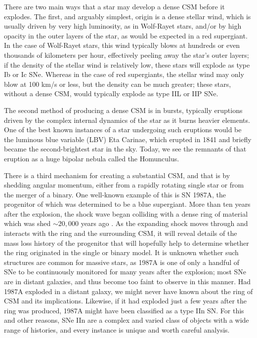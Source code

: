 \documentclass[a4paper,fleqn,usenatbib]{mnras}
\begin{document}
There are two main ways that a star may develop a dense CSM before it explodes. The first, and arguably simplest, origin is a dense stellar wind, which is usually driven by very high luminosity, as in Wolf-Rayet stars, and/or by high opacity in the outer layers of the star, as would be expected in a red supergiant. In the case of Wolf-Rayet stars, this wind typically blows at hundreds or even thousands of kilometers per hour, effectively peeling away the star's outer layers; if the density of the stellar wind is relatively low, these stars will explode as type Ib or Ic SNe. Whereas in the case of red supergiants, the stellar wind may only blow at 100 km/s or less, but the density can be much greater; these stars, without a dense CSM, would typically explode as type IIL or IIP SNe.

The second method of producing a dense CSM is in bursts, typically eruptions driven by the complex internal dynamics of the star as it burns heavier elements. One of the best known instances of a star undergoing such eruptions would be the luminous blue variable (LBV) Eta Carinae, which erupted in 1841 and briefly became the second-brightest star in the sky. Today, we see the remnants of that eruption as a huge bipolar nebula called the Homunculus.

There is a third mechanism for creating a substantial CSM, and that is by shedding angular momentum, either from a rapidly rotating single star or from the merger of a binary. One well-known example of this is SN 1987A, the progenitor of which was determined to be a blue supergiant. More than ten years after the explosion, the shock wave began colliding with a dense ring of material which was shed $\sim20,000$ years ago \citep{Fra15}. As the expanding shock moves through and interacts with the ring and the surrounding CSM, it will reveal details of the mass loss history of the progenitor that will hopefully help to determine whether the ring originated in the single or binary model. It is unknown whether such structures are common for massive stars, as 1987A is one of only a handful of SNe to be continuously monitored for many years after the explosion; most SNe are in distant galaxies, and thus become too faint to observe in this manner. Had 1987A exploded in a distant galaxy, we might never have known about the ring of CSM and its implications. Likewise, if it had exploded just a few years after the ring was produced, 1987A might have been classified as a type IIn SN. For this and other reasons, SNe IIn are a complex and varied class of objects with a wide range of histories, and every instance is unique and worth careful analysis.
\end{document}
